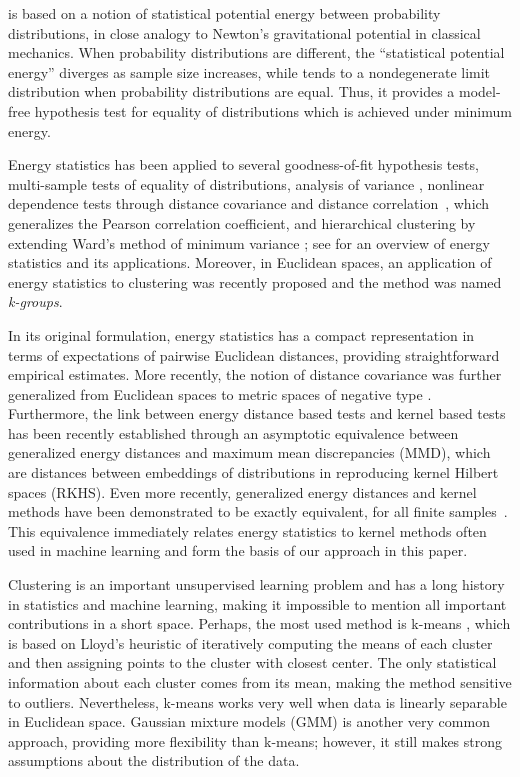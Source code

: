 \documentclass[10pt,journal,compsoc]{IEEEtran}
\begin{document}
 \cite{Szkely2013,Szkely2017}
is based on a 
notion of statistical potential energy between probability distributions,
in close analogy to Newton's gravitational potential in classical mechanics.
When probability distributions are different, the 
``statistical potential energy'' diverges as sample size increases, 
while tends 
to a nondegenerate limit distribution when probability
distributions are equal. 
Thus, it provides a model-free hypothesis test for equality of 
distributions which is achieved under minimum energy. 

Energy statistics has been applied to several goodness-of-fit 
hypothesis tests, multi-sample tests of equality of distributions, 
analysis of variance \cite{RizzoVariance}, nonlinear dependence tests through
distance covariance and distance correlation~\cite{Szekely2007-mm}, 
which generalizes the Pearson
correlation coefficient, and hierarchical clustering 
by extending Ward's method of minimum variance
\cite{RizzoClustering}; 
see \cite{Szkely2013,Szkely2017} for an overview of energy
statistics and its applications.
Moreover, in Euclidean spaces, an application of 
energy statistics to clustering
was recently proposed \cite{Kgroups} and the method was named 
\emph{k-groups}. 

In its original formulation, energy statistics has a compact representation
in terms of expectations of pairwise Euclidean distances, providing
straightforward empirical estimates. 
More recently, the notion of distance covariance was further 
generalized from Euclidean 
spaces to metric spaces of negative type \cite{Lyons}. Furthermore, 
the link between energy distance based tests and kernel 
based tests has 
been recently established \cite{Sejdinovic2013} 
through an asymptotic equivalence between generalized energy distances and maximum
mean discrepancies (MMD), which are distances between embeddings of 
distributions in reproducing kernel Hilbert spaces (RKHS).
Even more recently, generalized energy distances and kernel methods have been demonstrated to be exactly equivalent, for all finite samples~\cite{Shen2018-st}.
This equivalence immediately relates energy statistics to
kernel methods often used in machine learning and form the basis 
of our approach in this paper.

Clustering is an important unsupervised learning problem and 
has a long history in statistics and machine learning, making it
impossible to mention all important contributions in a short space. 
Perhaps, the most used method is k-means \cite{Lloyd,MacQueen,Forgy}, which
is based on Lloyd's heuristic \cite{Lloyd} of iteratively computing
the means of each cluster and then assigning points to
the cluster with closest center. The only statistical 
information about each cluster comes from its mean, making the method sensitive 
to outliers. Nevertheless, k-means works very well when data is 
linearly separable in Euclidean space. Gaussian mixture models (GMM) is 
another very common approach, providing more flexibility than k-means; 
however, it still makes strong assumptions about the distribution of 
the data.
\end{document}
